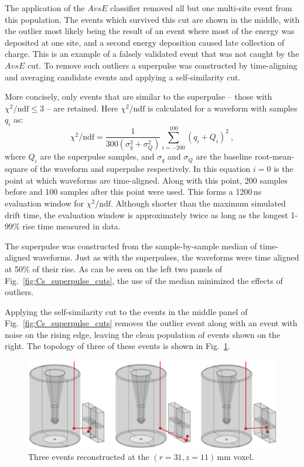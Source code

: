 The application of the $AvsE$ classifier removed all but one multi-site event from this population. The events which survived this cut are shown in the middle, with the outlier most likely being the result of an event where most of the energy was deposited at one site, and a second energy deposition caused late collection of charge. This is an example of a falsely validated event that was not caught by the $AvsE$ cut. To remove such outliers a superpulse was constructed by time-aligning and averaging candidate events and applying a self-similarity cut. 

More concisely, only events that are similar to the superpulse -- those with $\chi^2/\text{ndf} \le 3$ -- are retained. Here $\chi^2/\text{ndf}$ is calculated for a waveform with samples $q_i$ as:
\begin{equation}
	\chi^2/\text{ndf} = \frac{1}{300(\sigma_q^2 + \sigma_Q^2)}\sum_{i = -200}^{100}\left(q_i + Q_i\right)^2~,
	\label{eq:chi_sq_wfs}
\end{equation}
where $Q_i$ are the superpulse samples, and $\sigma_q$ and $\sigma_Q$ are the baseline root-mean-square of the waveform and superpulse respectively. In this equation $i=0$ is the point at which waveforms are time-aligned. Along with this point, 200 samples before and 100 samples after this point were used. This forms a 1200\,ns evaluation window for $\chi^2/\text{ndf}$. Although shorter than the maximum simulated drift time, the evaluation window is approximately twice as long as the longest 1-99\% rise time measured in data.  

The superpulse was constructed from the sample-by-sample median of time-aligned waveforms. Just as with the \BaS{} superpulses, the waveforms were time aligned at 50\% of their rise. As can be seen on the left two panels of Fig.~\ref{fig:Cs_superpulse_cuts}, the use of the median minimized the effects of outliers.

Applying the self-similarity cut to the events in the middle panel of Fig.~\ref{fig:Cs_superpulse_cuts} removes the outlier event along with an event with noise on the rising edge, leaving the clean population of events shown on the right. The topology of three of these events is shown in Fig.~\ref{fig:reco_events}.
\begin{figure}[htb]
    \centering
    \includegraphics[width=6in]{figs/pipeline/reco_events.png}
    \caption{Three events reconstructed at the $(r = 31, z = 11)$\,mm voxel.}
    \label{fig:reco_events}
\end{figure}

